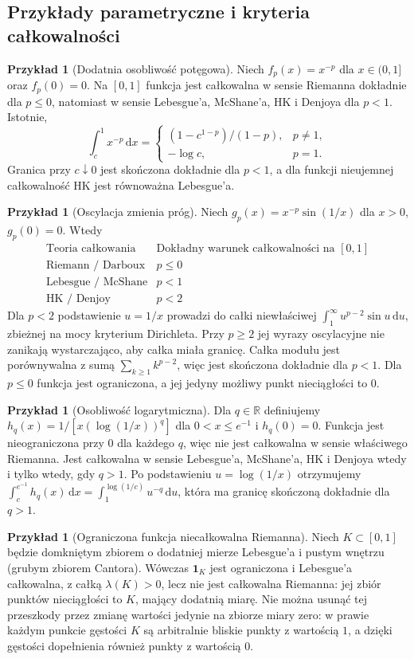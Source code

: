 \documentclass[11pt,a4paper]{article}
\numberwithin{equation}{section}
\theoremstyle{plain}
\theoremstyle{definition}
\newtheorem{przyklad}[twierdzenie]{Przykład}
\theoremstyle{remark}
\newcommand{\R}{\mathbb R}
\newcommand{\ind}[1]{\mathbf 1_{#1}}
\begin{document}
\subsection*{Przykłady parametryczne i kryteria całkowalności}
\begin{przyklad}[Dodatnia osobliwość potęgowa]
Niech $f_p(x)=x^{-p}$ dla $x\in(0,1]$ oraz $f_p(0)=0$. Na $[0,1]$ funkcja jest całkowalna w sensie Riemanna dokładnie dla $p\le0$, natomiast w sensie Lebesgue'a, McShane'a, HK i Denjoya dla $p<1$. Istotnie,
\[
\int_c^1x^{-p}\,\mathrm dx=\begin{cases}(1-c^{1-p})/(1-p),&p\ne1,\\-\log c,&p=1.\end{cases}
\]
Granica przy $c\downarrow0$ jest skończona dokładnie dla $p<1$, a dla funkcji nieujemnej całkowalność HK jest równoważna Lebesgue'a.
\end{przyklad}
\begin{przyklad}[Oscylacja zmienia próg]
Niech $g_p(x)=x^{-p}\sin(1/x)$ dla $x>0$, $g_p(0)=0$. Wtedy
\[
\begin{array}{c|c}
\text{Teoria całkowania}&\text{Dokładny warunek całkowalności na }[0,1]\\\hline
\text{Riemann / Darboux}&p\le0\\
\text{Lebesgue / McShane}&p<1\\
\text{HK / Denjoy}&p<2
\end{array}
\]
Dla $p<2$ podstawienie $u=1/x$ prowadzi do całki niewłaściwej $\int_1^\infty u^{p-2}\sin u\,\mathrm du$, zbieżnej na mocy kryterium Dirichleta. Przy $p\ge2$ jej wyrazy oscylacyjne nie zanikają wystarczająco, aby całka miała granicę. Całka modułu jest porównywalna z sumą $\sum_{k\ge1}k^{p-2}$, więc jest skończona dokładnie dla $p<1$. Dla $p\le0$ funkcja jest ograniczona, a jej jedyny możliwy punkt nieciągłości to $0$.
\end{przyklad}
\begin{przyklad}[Osobliwość logarytmiczna]
Dla $q\in\R$ definiujemy $h_q(x)=1/[x(\log(1/x))^q]$ dla $0<x\le e^{-1}$ i $h_q(0)=0$. Funkcja jest nieograniczona przy $0$ dla każdego $q$, więc nie jest całkowalna w sensie właściwego Riemanna. Jest całkowalna w sensie Lebesgue'a, McShane'a, HK i Denjoya wtedy i tylko wtedy, gdy $q>1$. Po podstawieniu $u=\log(1/x)$ otrzymujemy
$\int_c^{e^{-1}}h_q(x)\,\mathrm dx=\int_1^{\log(1/c)}u^{-q}\,\mathrm du$, która ma granicę skończoną dokładnie dla $q>1$.
\end{przyklad}
\begin{przyklad}[Ograniczona funkcja niecałkowalna Riemanna]
Niech $K\subset[0,1]$ będzie domkniętym zbiorem o dodatniej mierze Lebesgue'a i pustym wnętrzu (grubym zbiorem Cantora). Wówczas $\ind K$ jest ograniczona i Lebesgue'a całkowalna, z całką $\lambda(K)>0$, lecz nie jest całkowalna Riemanna: jej zbiór punktów nieciągłości to $K$, mający dodatnią miarę. Nie można usunąć tej przeszkody przez zmianę wartości jedynie na zbiorze miary zero: w prawie każdym punkcie gęstości $K$ są arbitralnie bliskie punkty z wartością $1$, a dzięki gęstości dopełnienia również punkty z wartością $0$.
\end{przyklad}
\end{document}
